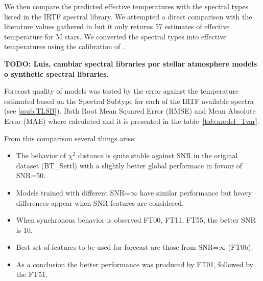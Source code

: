 




We then compare the predicted effective temperatures with the spectral
types listed in the IRTF spectral library. We attempted a direct
comparison with the literature values gathered in \cite{cesetti} but
it only returns 57 
estimates of effective temperature for M stars. We converted the
spectral types into effective temperatures using the calibration
of \cite{2009ApJ...702..154S}.

{\bf TODO: Luis, cambiar spectral libraries por stellar atmosphere
models o synthetic spectral libraries}.

Forecast quality of models was tested by the error against the
temperature estimated based on the Spectral Subtype for each of the
IRTF available spectra (see \ref{ssub:TLSB}).  Both Root Mean Squared
Error (RMSE) and Mean Absolute Error (MAE) where calculated and it is
presented in the table~\ref{tab:model_Tvar}.

From this comparison several things arise:
\begin{itemize}
 \item {The behavior of $\chi^2$ distance is quite stable against SNR 
	in the original dataset (BT\_Settl) with a slightly better global 
	performace in fovour of SNR=50.}
 \item {Models trained with different SNR=$\infty$ have similar performance but heavy 
	differences appear when SNR features are considered.}
 \item {When synchronous behavior is observed FT00, FT11, FT55, the better SNR is 10.}
 \item {Best set of features to be used for forecast are those from SNR=$\infty$ (FT0b).}
 \item {As a conclusion the better performance was produced by FT01, followed by the FT51.}
\end{itemize}

